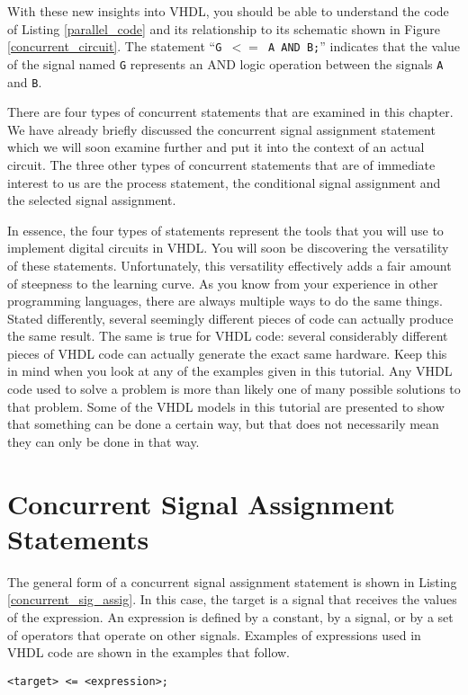 With these new insights into VHDL, you should be able to understand the code of Listing \ref{parallel_code} and its relationship to its schematic shown in Figure \ref{concurrent_circuit}. The statement ``\texttt{G~$<=$~A~AND~B;}'' indicates that the value of the signal named \texttt{G} represents an AND logic operation between the signals \texttt{A} and \texttt{B}.

There are four types of concurrent statements that are examined in this chapter. We have already briefly discussed the concurrent signal assignment statement which we will soon examine further and put it into the context of an actual circuit. The three other types of concurrent statements that are of immediate interest to us are the process statement, the conditional signal assignment and the selected signal assignment.

In essence, the four types of statements represent the tools that you will use to implement digital circuits in VHDL. You will soon be discovering the versatility of these statements. Unfortunately, this versatility effectively adds a fair amount of steepness to the learning curve. As you know from your experience in other programming languages, there are always multiple ways to do the same things. Stated differently, several seemingly different pieces of code can actually produce the same result. The same is true for VHDL code: several considerably different pieces of VHDL code can actually generate the exact same hardware. Keep this in mind when you look at any of the examples given in this tutorial. Any VHDL code used to solve a problem is more than likely one of many possible solutions to that problem. Some of the VHDL models in this tutorial are presented to show that something can be done a certain way, but that does not necessarily mean they can only be done in that way.

\section{Concurrent Signal Assignment Statements}
The general form of a concurrent signal assignment statement is shown in Listing \ref{concurrent_sig_assig}. In this case, the target is a signal that receives the values of the expression. An expression is defined by a constant, by a signal, or by a set of operators that operate on other signals. Examples of expressions used in VHDL code are shown in the examples that follow.

\noindent
\begin{minipage}{0.99\linewidth}
\begin{lstlisting}[label=concurrent_sig_assig, caption=Syntax for the concurrent signal assignment statement.]
<target> <= <expression>;
\end{lstlisting}
\end{minipage}

